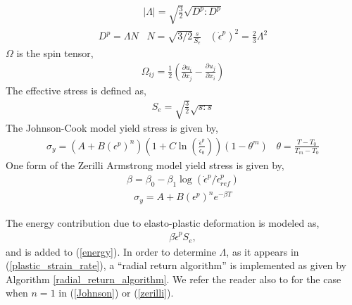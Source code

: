 \documentclass[]{article}
\begin{document}
\begin{eqnarray}
	|\Lambda|=\sqrt{\frac{3}{2}}\sqrt{D^{p}:D^{p}}
\end{eqnarray}
\begin{eqnarray}
	D^{p}=\Lambda N  \hspace{10pt} N=\sqrt{3/2}\frac{s}{S_{e}}
	\hspace{10pt} (\dot{\epsilon}^{p})^{2}=
	\frac{2}{3}\Lambda^{2}
	\label{plastic_strain_rate}
\end{eqnarray}
$\Omega$ is the spin tensor,
\begin{eqnarray}
	\Omega_{ij}=\frac{1}{2}(
	\frac{\partial u_{i}}{\partial x_{j}}-
	\frac{\partial u_{j}}{\partial x_{i}})
\end{eqnarray}
The effective stress is defined as,
\begin{eqnarray}
	S_{e}=\sqrt{\frac{3}{2}}\sqrt{s:s}
\end{eqnarray}
The Johnson-Cook model yield stress is given by,
\begin{eqnarray}
	\sigma_{y}=
	(A+B(\epsilon^{p})^{n})
	(1+C\ln(
	\frac{\dot{\epsilon}^{p}}
	{\dot{\epsilon}_{0}}
	))(1-\theta^{m}) \hspace{10pt}
	\theta=\frac{T-T_{0}}{T_{m}-T_{0}}
	\label{Johnson}
\end{eqnarray}
One form of the Zerilli Armstrong model yield stress is given by,
\begin{eqnarray}
	\beta=\beta_{0}-\beta_{1}
	\log(\dot{\epsilon}^{p}/\dot{\epsilon}^{p}_{ref})
\end{eqnarray}
\begin{eqnarray}
	\sigma_{y}=A+B(\epsilon^{p})^{n}e^{-\beta T}
	\label{zerilli}
\end{eqnarray}

The energy contribution due to elasto-plastic deformation is modeled as,
\begin{eqnarray}
	\beta\dot{\epsilon}^{p}S_{e},
\end{eqnarray}
and is added to (\ref{energy}).  In order to determine $\Lambda$, as it
appears in (\ref{plastic_strain_rate}), a ``radial
return algorithm'' is implemented as given by 
Algorithm \ref{radial_return_algorithm}.  We refer the reader also to 
\cite{tran2004particle} for the case when $n=1$ in (\ref{Johnson})
or (\ref{zerilli}).
\end{document}
